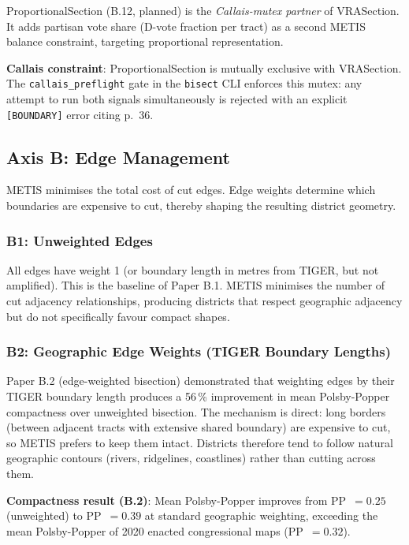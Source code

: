 ProportionalSection (B.12, planned) is the \emph{Callais-mutex partner} of
VRASection.
It adds partisan vote share (D-vote fraction per tract) as a second METIS balance
constraint, targeting proportional representation.

\textbf{Callais constraint}: ProportionalSection is mutually exclusive with
VRASection.
The \texttt{callais\_preflight} gate in the \texttt{bisect} CLI enforces
this mutex: any attempt to run both signals simultaneously is rejected with
an explicit \texttt{[BOUNDARY]} error citing \callais{} p.~36.

\subsection{Axis B: Edge Management}

METIS minimises the total cost of cut edges.
Edge weights determine which boundaries are expensive to cut, thereby shaping
the resulting district geometry.

\subsubsection*{B1: Unweighted Edges}

All edges have weight 1 (or boundary length in metres from TIGER, but not
amplified).
This is the baseline of Paper B.1.
METIS minimises the number of cut adjacency relationships, producing districts
that respect geographic adjacency but do not specifically favour compact shapes.

\subsubsection*{B2: Geographic Edge Weights (TIGER Boundary Lengths)}

Paper B.2 (edge-weighted bisection) demonstrated that weighting edges by their
TIGER boundary length produces a 56\,\% improvement in mean Polsby-Popper
compactness over unweighted bisection.
The mechanism is direct: long borders (between adjacent tracts with extensive
shared boundary) are expensive to cut, so METIS prefers to keep them intact.
Districts therefore tend to follow natural geographic contours (rivers,
ridgelines, coastlines) rather than cutting across them.

\textbf{Compactness result (B.2)}: Mean Polsby-Popper improves from PP~$=0.25$
(unweighted) to PP~$=0.39$ at standard geographic weighting, exceeding the
mean Polsby-Popper of 2020 enacted congressional maps (PP~$=0.32$).

